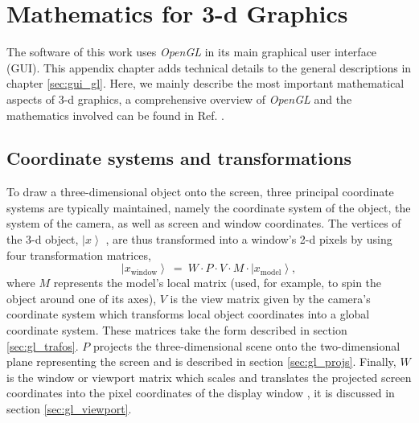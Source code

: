 %
%

\chapter{Mathematics for 3-d Graphics}
\label{ch:gl}

The software of this work uses \textit{OpenGL} \cite{web_OpenGL} in its main graphical user interface (GUI).
This appendix chapter adds technical details to the general descriptions in chapter \ref{sec:gui_gl}.
Here, we mainly describe the most important mathematical aspects of 3-d graphics, a comprehensive overview of 
\textit{OpenGL} and the mathematics involved can be found in Ref. \cite{Sellers2002}.



\section{Coordinate systems and transformations}
To draw a three-dimensional object onto the screen, three principal coordinate systems are typically maintained,
namely the coordinate system of the object, the system of the camera, as well as screen and window coordinates.
The vertices of the 3-d object, $\left|x\right>$ , are thus transformed into a window's 2-d pixels by using four
transformation matrices,
\begin{equation}
	\boxed{\left|x_{\mathrm{window}}\right> \ =\ W \cdot P \cdot V \cdot  M \cdot  \left| x_{\mathrm{model}} \right>,}
	\label{eq:gl_mvp}
\end{equation}
where $M$ represents the model's local matrix (used, for example, to spin the object around one of its axes),
$V$ is the view matrix given by the camera's coordinate system which transforms local object coordinates into
a global coordinate system. These matrices take the form described in section \ref{sec:gl_trafos}.
$P$ projects the three-dimensional scene onto the two-dimensional plane representing the screen \cite{web_gl_ortho, web_gl_perspective} and is described in section \ref{sec:gl_projs}. 
Finally, $W$ is the window or viewport matrix which scales and translates the projected screen coordinates 
into the pixel coordinates of the display window \cite{web_gl_viewport}, it is discussed in section \ref{sec:gl_viewport}.

